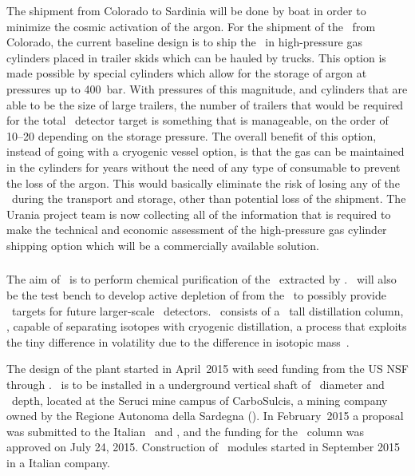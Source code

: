 The shipment from Colorado to Sardinia will be done by boat in order to minimize the cosmic activation of the argon. For the shipment of the \UAr\ from Colorado, the current baseline design is to ship the \UAr\ in high-pressure gas cylinders placed in trailer skids which can be hauled by trucks.  This option is made possible by special cylinders which allow for the storage of argon at pressures up to \SI{400}{\bar}.  With pressures of this magnitude, and cylinders that are able to be the size of large trailers, the number of trailers that would be required for the total \DSks\ detector target is something that is manageable, on the order of \numrange{10}{20} depending on the storage pressure.  The overall benefit of this option, instead of going with a cryogenic vessel option, is that the gas can be maintained in the cylinders for years without the need of any type of consumable to prevent the loss of the argon.  This would basically eliminate the risk of losing any of the \UAr\ during the transport and storage, other than potential loss of the shipment.  The Urania project team is now collecting all of the information that is required to make the technical and economic assessment of the high-pressure gas cylinder shipping option which will be a commercially available solution.


\subsubsection{\Aria}
The aim of  \Aria\ is to perform chemical purification of the \UAr\ extracted by \Urania.  \Aria\ will also be the test bench to develop active depletion of  from the \UAr\ to possibly provide \DAr\ targets for future larger-scale \LAr\ detectors.  \Aria\ consists of a \AriaSeruciHeight\ tall distillation column, \SeruciOne, capable of separating isotopes with cryogenic distillation, a process that exploits the tiny difference in volatility due to the difference in isotopic mass~\cite{Lindemann:1919bq,Urey:1932gl,deBoer:1948br,deBoer:1948fc,deBoer:1939cs,Bigeleisen:1961cm}.

The design of the plant started in April~2015 with seed funding from the US NSF through .  \Aria\ is to be installed in a underground  vertical shaft of  \AriaMonteSinniDiameter\ diameter and \AriaSeruciHeight\ depth,  located at the Seruci mine campus of CarboSulcis, a mining company owned by the Regione Autonoma della Sardegna (\RAS).  In February~2015 a proposal was submitted to the Italian \INFN\ and \RAS, and the funding for the \SeruciOne\ column was approved on July 24, 2015.  Construction of \SeruciOne\ modules started in September 2015 in a Italian company.    

